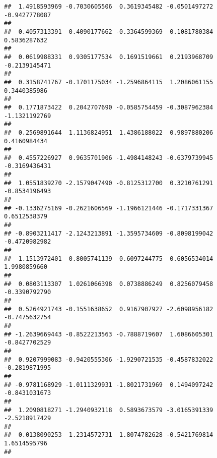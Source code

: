 \documentclass[]{article}
\begin{document}
\begin{verbatim}
##  1.4918593969 -0.7030605506  0.3619345482 -0.0501497272 -0.9427778087 
##                                                                       
##  0.4057313391  0.4090177662 -0.3364599369  0.1081780384  0.5836287632 
##                                                                       
##  0.0619988331  0.9305177534  0.1691519661  0.2193968709 -0.2139145471 
##                                                                       
##  0.3158741767 -0.1701175034 -1.2596864115  1.2086061155  0.3440385986 
##                                                                       
##  0.1771873422  0.2042707690 -0.0585754459 -0.3087962384 -1.1321192769 
##                                                                       
##  0.2569891644  1.1136824951  1.4386188022  0.9897880206  0.4160984434 
##                                                                       
##  0.4557226927  0.9635701906 -1.4984148243 -0.6379739945 -0.3169436431 
##                                                                       
##  1.0551839270 -2.1579047490 -0.8125312700  0.3210761291 -0.8534196493 
##                                                                       
## -0.1336275169 -0.2621606569 -1.1966121446 -0.1717331367  0.6512538379 
##                                                                       
## -0.8903211417 -2.1243213891 -1.3595734609 -0.8098199042 -0.4720982982 
##                                                                       
##  1.1513972401  0.8005741139  0.6097244775  0.6056534014  1.9980859660 
##                                                                       
##  0.0803113307  1.0261066398  0.0738886249  0.8256079458 -0.3390792790 
##                                                                       
##  0.5264921743 -0.1551638652  0.9167907927 -2.6098956182 -0.7475632754 
##                                                                       
## -1.2639669443 -0.8522213563 -0.7888719607  1.6086605301 -0.8427702529 
##                                                                       
##  0.9207999083 -0.9420555306 -1.9290721535 -0.4587832022 -0.2819871995 
##                                                                       
## -0.9781168929 -1.0111329931 -1.8021731969  0.1494097242 -0.8431031673 
##                                                                       
##  1.2090818271 -1.2940932118  0.5893673579 -3.0165391339 -2.5218917429 
##                                                                       
##  0.0138090253  1.2314572731  1.8074782628 -0.5421769814  1.6514595796 
##                                                                       

\end{verbatim}
\end{document}
